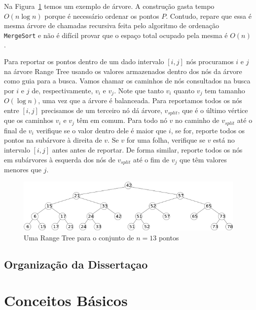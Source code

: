 \documentclass[dissertacao, brazil]{ThesisPUC}
\begin{document}
Na Figura~\ref{fig:rangeTree} temos um exemplo de árvore.
A construção gasta tempo $O(n\log n)$ porque é necessário ordenar
os pontos $P$. Contudo, repare que essa é mesma árvore de chamadas
recursiva feita pelo algoritmo de ordenação {\tt MergeSort} e não é 
difícil provar que o espaço total ocupado pela mesma é $O(n)$.

Para reportar os pontos dentro de um dado intervalo
$[i, j]$ nós procuramos $i$ e $j$ na árvore Range Tree usando 
os valores armazenados dentro dos nós da árvore como guia para a busca.
Vamos chamar os caminhos de nós consultados na busca por $i$ e $j$
de, respectivamente, $v_i$ e $v_j$. Note que tanto $v_i$ quanto $v_j$
tem tamanho $O(\log n)$, uma vez que a árvore é balanceada. Para
reportamos todos os nós entre $[i, j]$ precisamos de um terceiro nó
dá árvore, $v_{split}$, que é o último vértice que os caminhos $v_i$
e $v_j$ têm em comum. Para todo nó $v$ no caminho de $v_{split}$ até o 
final de $v_i$ verifique se o valor dentro dele é maior que $i$, se 
for, reporte todos os pontos na subárvore à direita de $v$. Se $v$
for uma folha, verifique se $v$ está no intervalo $[i, j]$ antes
antes de reportar. De forma similar, reporte todos os nós em 
subárvores à esquerda dos nós de $v_{split}$ até o fim de $v_j$
que têm valores menores que $j$.  


\begin{figure}[htp]
\begin{center}
\includegraphics[scale=0.5]{range_tree.png}
\caption{Uma Range Tree para o conjunto de $n=13$ pontos}
\label{fig:rangeTree}
\end{center}
\end{figure}



\subsection{Organização da Dissertaçao}

\section{Conceitos Básicos}
\end{document}
